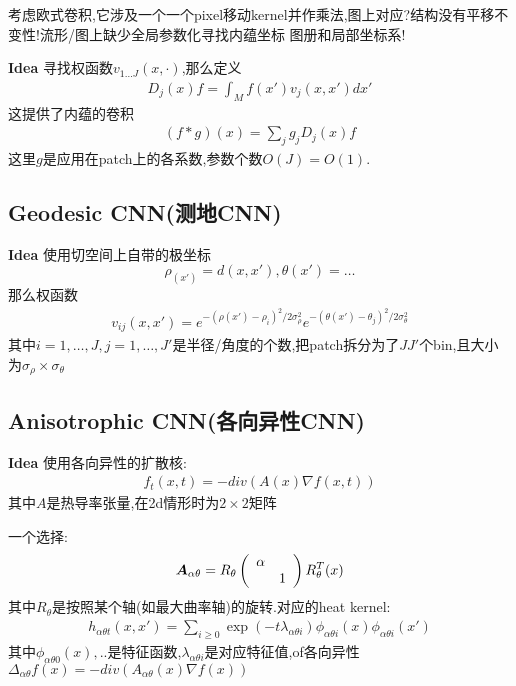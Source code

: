 \documentclass{article}
\begin{document}
考虑欧式卷积,它涉及一个一个pixel移动kernel并作乘法,图上对应?结构没有平移不变性!流形/图上缺少全局参数化\tRarr 寻找内蕴坐标 \tRarr 图册和局部坐标系!

\textbf{Idea} 寻找权函数$v_{1\dots J}(x,\cdot)$,那么定义
\begin{align}
    \label{d1}
    D_j(x)f=\int_Mf(x')v_j(x,x')dx'
\end{align}
这提供了内蕴的卷积
\begin{align}
    \label{d2}
    (f*g)(x)=\sum_j g_jD_j(x)f
\end{align}
这里$g$是应用在patch上的各系数,参数个数$O(J)=O(1)$.

\subsection{Geodesic CNN(测地CNN)}

\textbf{Idea} 使用切空间上自带的极坐标
$$\rho_(x')=d(x,x'),\theta(x')=\dots$$
那么权函数
\begin{align}
    v_{ij}(x,x')=e^{-(\rho(x')-\rho_i)^2/2\sigma_\rho^2}e^{-(\theta(x')-\theta_j)^2/2\sigma_\theta^2}
\end{align}
其中$i=1,\dots,J,j=1,\dots,J'$是半径/角度的个数,把patch拆分为了$J J'$个bin,且大小为$\sigma_\rho\times \sigma_\theta$


\subsection{Anisotrophic CNN(各向异性CNN)}

\textbf{Idea} 使用各向异性的扩散核:
\begin{align}
    f_t(x,t)=-div(A(x)\nabla f(x,t))
\end{align}
其中$A$是热导率张量,在2d情形时为$2\times2$矩阵

一个选择:\begin{align}
    \boldsymbol{A}_{\alpha\theta}=R_\theta \left(\begin{array}{ccc}
        \alpha  &\\
           &1
    \end{array}\right)R_\theta^T(x)
\end{align}
其中$R_\theta$是按照某个轴(如最大曲率轴)的旋转.对应的heat kernel:
\begin{align}
    h_{\alpha\theta t}(x,x')=\sum_{i\geq 0}\exp(-t\lambda_{\alpha \theta i})\phi_{\alpha \theta i}(x)\phi_{\alpha \theta i}(x')
\end{align}
其中$\phi_{\alpha \theta 0}(x),..$是特征函数,$\lambda_{\alpha \theta i}$是对应特征值,of各向异性\lop$\Delta_{\alpha \theta}f(x)=-div(A_{\alpha \theta}(x)\nabla f(x))$
\end{document}
